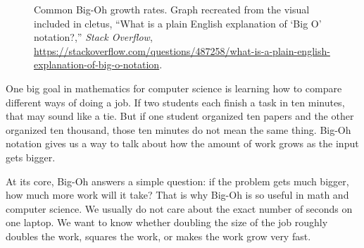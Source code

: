 \documentclass[11pt,oneside]{book}
\theoremstyle{definition}
\begin{document}
\begin{figure}[H]
\centering
{}
\caption{Common Big-Oh growth rates. Graph recreated from the visual included in cletus, ``What is a plain English explanation of `Big O' notation?,'' \emph{Stack Overflow}, \url{https://stackoverflow.com/questions/487258/what-is-a-plain-english-explanation-of-big-o-notation}.}
\label{fig:BigOhComplexity}
\end{figure}

One big goal in mathematics for computer science is learning how to compare different ways of doing a job.
If two students each finish a task in ten minutes, that may sound like a tie.
But if one student organized ten papers and the other organized ten thousand, those ten minutes do not mean the same thing.
Big-Oh notation gives us a way to talk about how the amount of work grows as the input gets bigger.

At its core, Big-Oh answers a simple question: if the problem gets much bigger, how much more work will it take?
That is why Big-Oh is so useful in math and computer science.
We usually do not care about the exact number of seconds on one laptop.
We want to know whether doubling the size of the job roughly doubles the work, squares the work, or makes the work grow very fast.
\end{document}
